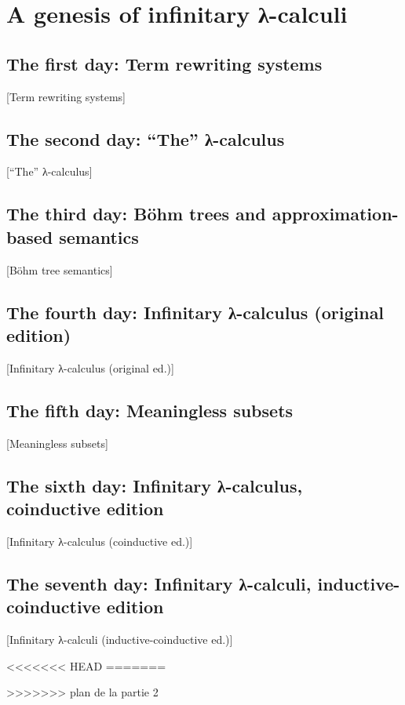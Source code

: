 \chapter{A genesis of infinitary λ-calculi}
\label{chap:lambda}
\margintoc


\section{The first day: Term rewriting systems}%
[Term rewriting systems]

\lipsum[1]


\section{The second day: \enquote{The} λ-calculus}%
[\enquote{The} λ-calculus]

\lipsum[2]


\section{The third day: Böhm trees and approximation-based semantics}%
[Böhm tree semantics]

\lipsum[3]


\section{The fourth day: Infinitary λ-calculus (original edition)}%
[Infinitary λ-calculus (original ed.)]

\lipsum[4]


\section{The fifth day: Meaningless subsets}%
[Meaningless subsets]

\lipsum[5]


\section{The sixth day: Infinitary λ-calculus, coinductive edition}%
[Infinitary λ-calculus (coinductive ed.)]

\lipsum[6]


\section{The seventh day: Infinitary λ-calculi, inductive-coinductive edition}%
[Infinitary λ-calculi (inductive-coinductive ed.)]

\lipsum[7]

<<<<<<< HEAD
=======

>>>>>>> plan de la partie 2
